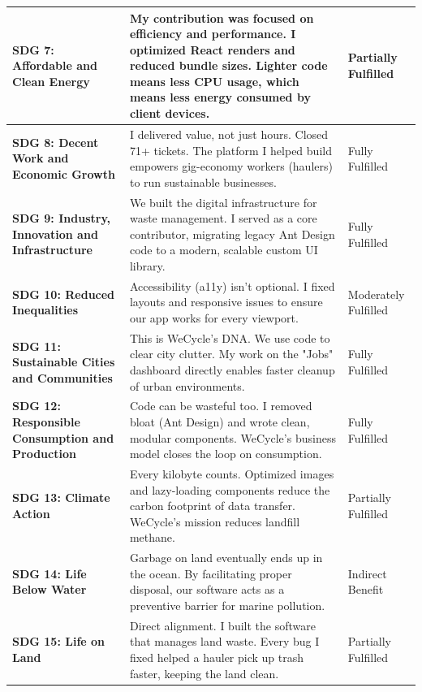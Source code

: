 \begin{longtable}{|p{5.3cm}|p{6.3cm}|p{3cm}|}
\textbf{SDG 7: Affordable and Clean Energy} & My contribution was focused on efficiency and performance. I optimized React renders and reduced bundle sizes. Lighter code means less CPU usage, which means less energy consumed by client devices. & Partially Fulfilled \\
\hline

\textbf{SDG 8: Decent Work and Economic Growth} & I delivered value, not just hours. Closed 71+ tickets. The platform I helped build empowers gig-economy workers (haulers) to run sustainable businesses. & Fully Fulfilled \\
\hline

\textbf{SDG 9: Industry, Innovation and Infrastructure} & We built the digital infrastructure for waste management. I served as a core contributor, migrating legacy Ant Design code to a modern, scalable custom UI library. & Fully Fulfilled \\
\hline

\textbf{SDG 10: Reduced Inequalities} & Accessibility (a11y) isn't optional. I fixed layouts and responsive issues to ensure our app works for every viewport. & Moderately Fulfilled \\
\hline

\textbf{SDG 11: Sustainable Cities and Communities} & This is WeCycle's DNA. We use code to clear city clutter. My work on the "Jobs" dashboard directly enables faster cleanup of urban environments. & Fully Fulfilled \\
\hline

\textbf{SDG 12: Responsible Consumption and Production} & Code can be wasteful too. I removed bloat (Ant Design) and wrote clean, modular components. WeCycle's business model closes the loop on consumption. & Fully Fulfilled \\
\hline

\textbf{SDG 13: Climate Action} & Every kilobyte counts. Optimized images and lazy-loading components reduce the carbon footprint of data transfer. WeCycle's mission reduces landfill methane. & Partially Fulfilled \\
\hline

\textbf{SDG 14: Life Below Water} & Garbage on land eventually ends up in the ocean. By facilitating proper disposal, our software acts as a preventive barrier for marine pollution. & Indirect Benefit \\
\hline

\textbf{SDG 15: Life on Land} & Direct alignment. I built the software that manages land waste. Every bug I fixed helped a hauler pick up trash faster, keeping the land clean. & Partially Fulfilled \\
\hline


\end{longtable}
